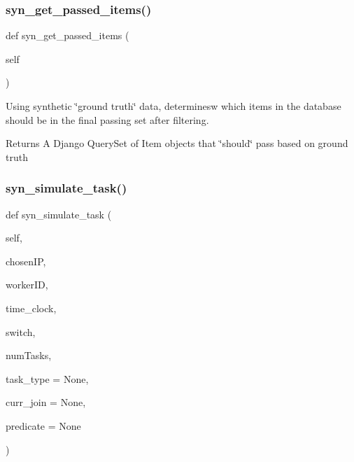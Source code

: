 \subsubsection{\texorpdfstring{syn\+\_\+get\+\_\+passed\+\_\+items()}{syn\_get\_passed\_items()}}
{\footnotesize\ttfamily def syn\+\_\+get\+\_\+passed\+\_\+items (\begin{DoxyParamCaption}\item[{}]{self }\end{DoxyParamCaption})}



Using synthetic \char`\"{}ground truth\char`\"{} data, determinesw which items in the database should be in the final passing set after filtering. 

\begin{DoxyReturn}{Returns}
A Django Query\+Set of Item objects that \char`\"{}should\char`\"{} pass based on ground truth 
\end{DoxyReturn}
\mbox{\label{classdynamicfilterapp_1_1test__simulations_1_1_simulation_test_adb57a1130669e13cca7754f0a6ea040f}} 
\subsubsection{\texorpdfstring{syn\+\_\+simulate\+\_\+task()}{syn\_simulate\_task()}}
{\footnotesize\ttfamily def syn\+\_\+simulate\+\_\+task (\begin{DoxyParamCaption}\item[{}]{self,  }\item[{}]{chosen\+IP,  }\item[{}]{worker\+ID,  }\item[{}]{time\+\_\+clock,  }\item[{}]{switch,  }\item[{}]{num\+Tasks,  }\item[{}]{task\+\_\+type = {\ttfamily None},  }\item[{}]{curr\+\_\+join = {\ttfamily None},  }\item[{}]{predicate = {\ttfamily None} }\end{DoxyParamCaption})}



